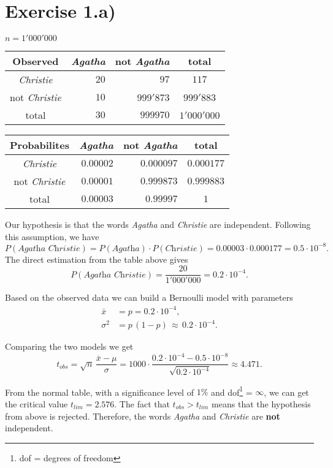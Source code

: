 \documentclass[a4paper]{article}
\begin{document}
\section*{Exercise 1.a)}
$n = 1'000'000$

\begin{table}[h]
\centering
\begin{tabular}{c|r|r|c}
	\textbf{Observed} 		& \textit{Agatha}	& not \textit{Agatha} 	& total \\\hline
	\textit{Christie} 		& $20$ 				& $97$ 					& $117$	\\
	not \textit{Christie} 	& $10$	 			& $999'873$				& $999'883$ \\ \hline
    total 					& $30$	 			& $999970$ 				& $1'000'000$
\end{tabular}
\end{table}

\begin{table}[h]
\centering
\begin{tabular}{c|r|r|c}
	\textbf{Probabilites} 	& \textit{Agatha}	& not \textit{Agatha} 	& total 		\\\hline
	\textit{Christie} 		& $0.00002$			& $0.000097$ 			& $0.000177$	\\
	not \textit{Christie} 	& $0.00001$			& $0.999873$			& $0.999883$ 	\\\hline
    total 					& $0.00003$	 		& $0.99997$				& $1$
\end{tabular}
\end{table}

\noindent Our hypothesis is that the words \textit{Agatha} and \textit{Christie} are independent. Following this assumption, we have
$$P(\textit{Agatha Christie}) = P(\textit{Agatha}) \cdot P(\textit{Christie}) = 0.00003 \cdot 0.000177 = 0.5 \cdot 10^{-8}.$$
\noindent The direct estimation from the table above gives
$$P(\textit{Agatha Christie}) = \frac{20}{1'000'000} = 0.2 \cdot 10^{-4}.$$

\noindent Based on the observed data we can build a Bernoulli model with parameters
\begin{align*}
\bar{x} &= p = 0.2 \cdot 10^{-4}, \\
	\sigma^2 &= p\,(1-p) \, \approx \, 0.2 \cdot 10^{-4}.
\end{align*}

\noindent Comparing the two models we get 
$$ t_{obs} = \sqrt{n} \, \frac{\bar{x} - \mu}{\sigma} = 1000 \cdot \frac{0.2 \cdot 10^{-4} - 0.5 \cdot 10^{-8}}{\sqrt{0.2 \cdot 10^{-4}}} \approx 4.471.$$

\noindent From the normal table, with a significance level of $1\%$ and dof\footnote{dof = degrees of freedom} = $\infty$, we can get the critical value $t_{lim} = 2.576$. The fact that $t_{obs} > t_{lim}$ means that the hypothesis from above is rejected. Therefore, the words \textit{Agatha} and \textit{Christie} are \textbf{not} independent.
\end{document}
